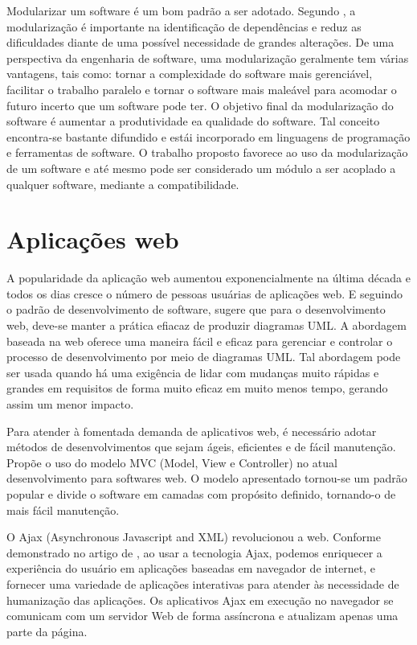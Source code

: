 Modularizar um software é um bom padrão a ser adotado. Segundo \citep{7062705}, a modularização é importante na identificação de dependências e reduz as dificuldades diante de uma possível necessidade de grandes alterações. De uma perspectiva da engenharia de software, uma modularização geralmente tem várias vantagens, tais como: tornar a complexidade do software mais gerenciável, facilitar o trabalho paralelo e tornar o software mais maleável para acomodar o futuro incerto que um software pode ter. O objetivo final da modularização do software é aumentar a produtividade ea qualidade do software. Tal conceito encontra-se bastante difundido e estái incorporado em linguagens de programação e ferramentas de software. O trabalho proposto favorece ao uso da modularização de um software e até mesmo pode ser considerado um módulo a ser acoplado a qualquer software, mediante a compatibilidade.


\section{Aplicações web}\label{sec:apps_web}


A popularidade da aplicação web aumentou exponencialmente na última década e todos os dias cresce o número de pessoas usuárias de aplicações web. E seguindo o padrão de desenvolvimento de software, \citep{7813710} sugere que para o desenvolvimento web, deve-se manter a prática efiacaz de produzir diagramas UML. A abordagem baseada na web oferece uma maneira fácil e eficaz para gerenciar e controlar o processo de desenvolvimento por meio de diagramas UML. Tal abordagem pode ser usada quando há uma exigência de lidar com mudanças muito rápidas e grandes em requisitos de forma muito eficaz em muito menos tempo, gerando assim um menor impacto. 


Para atender à fomentada demanda de aplicativos web, é necessário adotar métodos de desenvolvimentos que sejam ágeis, eficientes e de fácil manutenção. \cite{1372143} Propõe o uso do modelo MVC (Model, View e Controller) no atual desenvolvimento para softwares web. O modelo apresentado tornou-se um padrão popular e divide o software em camadas com propósito definido, tornando-o de mais fácil manutenção.

O Ajax (Asynchronous Javascript and XML) revolucionou a web. Conforme demonstrado no artigo de \citep{6845605}, ao usar a tecnologia Ajax, podemos enriquecer a experiência do usuário em aplicações baseadas em navegador de internet, e fornecer uma variedade de aplicações interativas para atender às necessidade de humanização das aplicações.
Os aplicativos Ajax em execução no navegador se comunicam com um servidor Web de forma assíncrona e atualizam apenas uma parte da página.